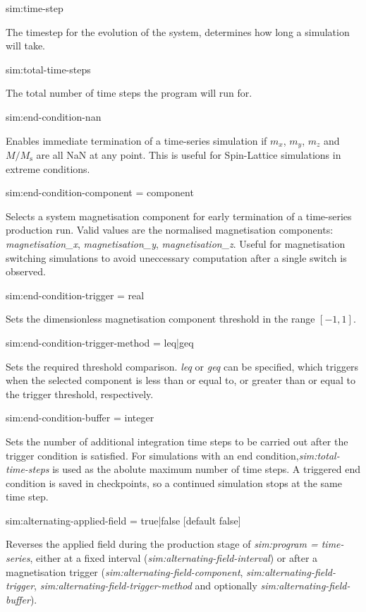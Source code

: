 {\zicf sim:time-step} The timestep for the evolution of the system, determines how long a simulation will take.

{\zicf sim:total-time-steps} The total number of time steps the program will run for.

{\zicf sim:end-condition-nan} Enables immediate termination of a time-series simulation if $m_x$, $m_y$, $m_z$ and $M/M_{\mathrm{s}}$ are all NaN at any point. This is useful for Spin-Lattice simulations in extreme conditions.

{\zicf sim:end-condition-component = component}
Selects a system magnetisation component for early termination of a time-series production run. Valid values are the normalised magnetisation components: \textit{magnetisation\_x}, \textit{magnetisation\_y}, \textit{magnetisation\_z}. Useful for magnetisation switching simulations to avoid uneccessary computation after a single switch is observed.

{\zicf sim:end-condition-trigger = real}
Sets the dimensionless magnetisation component threshold in the range $[-1,1]$.

{\zicf sim:end-condition-trigger-method = leq|geq}
Sets the required threshold comparison. \textit{leq} or \textit{geq} can be specified, which triggers when the selected component is less than or equal to, or greater than or equal to the trigger threshold, respectively.

{\zicf sim:end-condition-buffer = integer}
Sets the number of additional integration time steps to be carried out after the trigger condition is satisfied. For simulations with an end condition,\textit{sim:total-time-steps} is used as the abolute maximum number of time steps. A triggered end condition is saved in checkpoints, so a continued simulation stops at the same time step.

{\zicf sim:alternating-applied-field = true|false [default false]}
Reverses the applied field during the production stage of \textit{sim:program = time-series}, either at a fixed interval (\textit{sim:alternating-field-interval}) or after a magnetisation trigger (\textit{sim:alternating-field-component}, \textit{sim:alternating-field-trigger}, \textit{sim:alternating-field-trigger-method} and optionally \textit{sim:alternating-field-buffer}).

